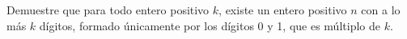 Demuestre que para todo entero positivo $k$, existe un entero positivo $n$ con a lo más $k$ dígitos, formado únicamente por los dígitos 0 y 1, que es múltiplo de $k$.

